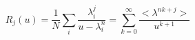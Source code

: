 \begin{equation}
R_j (u) =  \frac 1 N \sum_i\frac{\lambda_i^{j}}{u-\lambda_i^n}
= \sum_{k=0}^\infty\frac {< \lambda^{nk+j}>}{u^{k+1}}
\end{equation}

